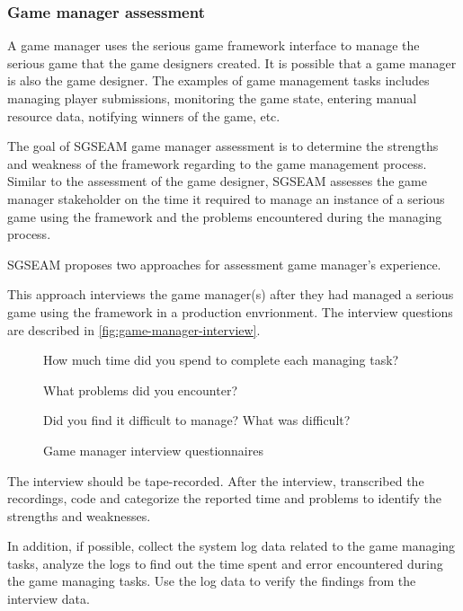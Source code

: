 \subsubsection{Game manager assessment}

A game manager uses the serious game framework interface to manage the serious game that the game
designers created. It is possible that a game manager is also the game designer.
The examples of game management tasks includes managing player submissions, monitoring the game 
state, entering manual resource data, notifying winners of the game, etc.

The goal of SGSEAM game manager assessment is to determine the strengths and weakness of the framework 
regarding to the game management process. Similar to the assessment of the game designer, SGSEAM assesses 
the game manager stakeholder on the time it required to manage an instance of a serious game using the framework
and the problems encountered during the managing process.

SGSEAM proposes two approaches for assessment game manager's experience.

\label{Post-hoc game manager interview}

This approach interviews the game manager(s) after they had managed a serious game using the framework 
in a production envrionment. The interview questions are described in \autoref{fig:game-manager-interview}.
 
\begin{figure}[ht!]
\begin{mybox}
\begin{compactenum}
\item How much time did you spend to complete each managing task?
\item What problems did you encounter?
\item Did you find it difficult to manage? What was difficult?
\end{compactenum}
\end{mybox}
\caption{Game manager interview questionnaires}
\label{fig:game-manager-interview}  
\end{figure}

The interview should be tape-recorded. After the interview, transcribed the recordings, code and categorize the reported 
time and problems to identify the strengths and weaknesses.

In addition, if possible, collect the system log data related to the game managing tasks, analyze the logs to find out the time 
spent and error encountered during the game managing tasks. Use the log data to verify the findings from the interview data.

